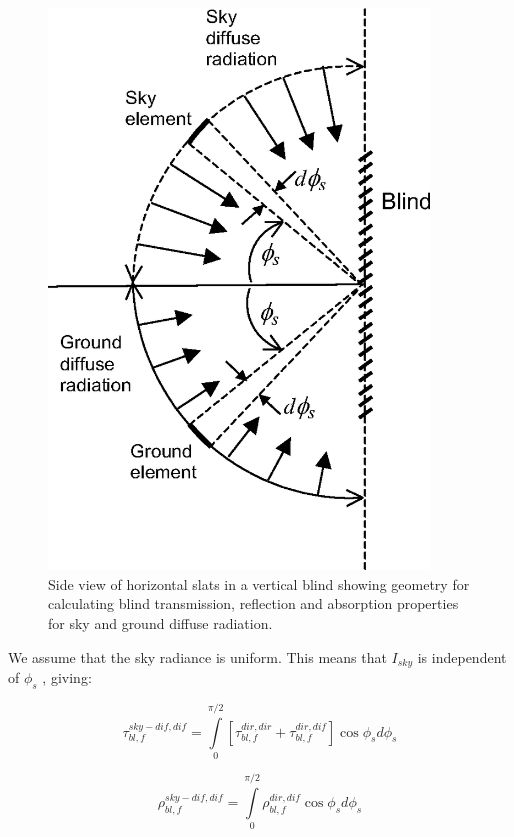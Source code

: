 \begin{figure}[hbtp] %
\centering
\includegraphics[width=0.9\textwidth, height=0.9\textheight, keepaspectratio=true]{media/image1090.png}
\caption{Side view of horizontal slats in a vertical blind showing geometry for calculating blind transmission, reflection and absorption properties for sky and ground diffuse radiation. \protect \label{fig:side-view-of-horizontal-slats-in-a-vertical}}
\end{figure}

We assume that the sky radiance is uniform. This means that \({I_{sky}}\) is independent of \({\phi_s}\) , giving:

\begin{equation}
\tau_{bl,f}^{sky - dif,dif} = \int\limits_0^{\pi /2} {\left[ {\tau_{bl,f}^{dir,dir} + \tau_{bl,f}^{dir,dif}} \right]\cos {\phi_s}d{\phi_s}}
\end{equation}

\begin{equation}
\rho_{bl,f}^{sky - dif,dif} = \int\limits_0^{\pi /2} {\rho_{bl,f}^{dir,dif}\cos {\phi_s}d{\phi_s}}
\end{equation}

